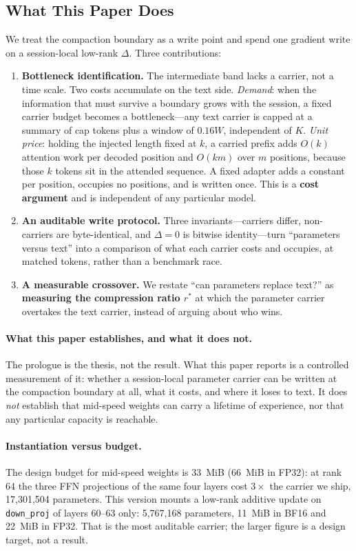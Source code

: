 \documentclass[sigconf,nonacm]{acmart}
\begin{document}
\subsection{What This Paper Does}
We treat the compaction boundary as a write point and spend one gradient write on a session-local
low-rank $\Delta$. Three contributions:
\begin{enumerate}[leftmargin=1.2em]
\item \textbf{Bottleneck identification.} The intermediate band lacks a carrier, not a time scale. Two
costs accumulate on the text side. \emph{Demand}: when the information that must survive a boundary grows
with the session, a fixed carrier budget becomes a bottleneck---any text carrier is capped at a summary of cap
tokens plus a window of $0.16W$, independent of $K$. \emph{Unit price}: holding the injected length fixed at $k$, a carried
prefix adds $O(k)$ attention work per decoded position and $O(km)$ over $m$ positions, because those $k$ tokens
sit in the attended sequence. A fixed adapter adds a constant per position, occupies no positions, and is written
once. This is a \textbf{cost argument} and is independent of any
particular model.
\item \textbf{An auditable write protocol.} Three invariants---carriers differ, non-carriers are
byte-identical, and $\Delta=0$ is bitwise identity---turn ``parameters versus text'' into a comparison of what each
carrier costs and occupies, at matched tokens, rather than a benchmark race.
\item \textbf{A measurable crossover.} We restate ``can parameters replace text?'' as
\textbf{measuring the compression ratio $r^\ast$} at which the parameter carrier overtakes the text
carrier, instead of arguing about who wins.
\end{enumerate}

\paragraph{What this paper establishes, and what it does not.} The prologue is the thesis, not the result. What
this paper reports is a controlled measurement of it: whether a session-local parameter carrier can be written at
the compaction boundary at all, what it costs, and where it loses to text. It does \emph{not} establish that
mid-speed weights can carry a lifetime of experience, nor that any particular capacity is reachable.

\paragraph{Instantiation versus budget.} The design budget for mid-speed weights is 33~MiB (66~MiB in FP32):
at rank 64 the three FFN projections of the same four layers cost $3\times$ the carrier we ship, 17,301,504
parameters. This version mounts a low-rank additive update on \texttt{down\_proj} of layers 60--63 only:
5,767,168 parameters, 11~MiB in BF16 and 22~MiB in FP32. That is the most auditable carrier; the
larger figure is a design target, not a result.
\end{document}

